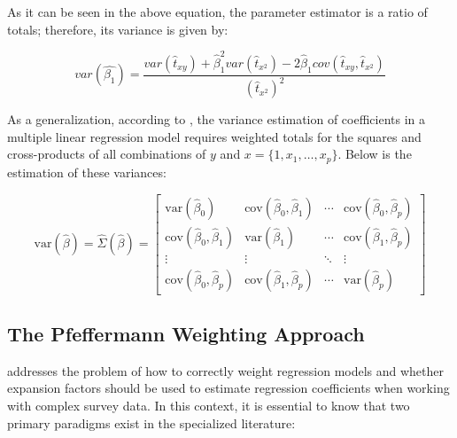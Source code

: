 \documentclass[
  12pt,
]{book}
\begin{document}
As it can be seen in the above equation, the parameter estimator is a ratio of totals; therefore, its variance is given by:

\[
var\left(\hat{\beta_{1}}\right)  =  \frac{var\left(\hat{t}_{xy}\right)+\hat{\beta}_{1}^{2}var\left(\hat{t}_{x^{2}}\right)-2\hat{\beta}_{1}cov\left(\hat{t}_{xy},\hat{t}_{x^{2}}\right)}{\left(\hat{t}_{x^{2}}\right)^{2}}
\]

As a generalization, according to \citet{kish1974inference}, the variance estimation of coefficients in a multiple linear regression model requires weighted totals for the squares and cross-products of all combinations of \(y\) and \(x = \{1, x_{1}, \ldots, x_{p}\}\). Below is the estimation of these variances:

\[
\text{var}\left(\hat{\beta}\right) = \hat{\Sigma}\left(\hat{\beta}\right) = 
\begin{bmatrix}
\text{var}\left(\hat{\beta}_{0}\right) & \text{cov}\left(\hat{\beta}_{0},\hat{\beta}_{1}\right) & \cdots & \text{cov}\left(\hat{\beta}_{0},\hat{\beta}_{p}\right) \\
\text{cov}\left(\hat{\beta}_{0},\hat{\beta}_{1}\right) & \text{var}\left(\hat{\beta}_{1}\right) & \cdots & \text{cov}\left(\hat{\beta}_{1},\hat{\beta}_{p}\right) \\
\vdots & \vdots & \ddots & \vdots \\
\text{cov}\left(\hat{\beta}_{0},\hat{\beta}_{p}\right) & \text{cov}\left(\hat{\beta}_{1},\hat{\beta}_{p}\right) & \cdots & \text{var}\left(\hat{\beta}_{p}\right)
\end{bmatrix}
\]

\hypertarget{the-pfeffermann-weighting-approach}{%
\subsection{The Pfeffermann Weighting Approach}\label{the-pfeffermann-weighting-approach}}

\citet{Heeringa_West_Berglund_2017} addresses the problem of how to correctly weight regression models and whether expansion factors should be used to estimate regression coefficients when working with complex survey data. In this context, it is essential to know that two primary paradigms exist in the specialized literature:
\end{document}
